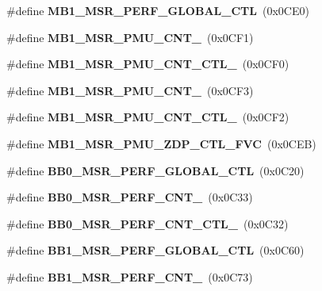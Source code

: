 \begin{DoxyCompactItemize}
\item 
\#define {\bfseries M\+B1\+\_\+\+M\+S\+R\+\_\+\+P\+E\+R\+F\+\_\+\+G\+L\+O\+B\+A\+L\+\_\+\+C\+T\+L}~(0x0\+C\+E0)\label{types_8h_a8aaf763a5f24ae67e344355e5e29b1d9}

\item 
\#define {\bfseries M\+B1\+\_\+\+M\+S\+R\+\_\+\+P\+M\+U\+\_\+\+C\+N\+T\+\_}~(0x0\+C\+F1)\label{types_8h_a81d488eaa84dfb353d4efcf2b1e20081}

\item 
\#define {\bfseries M\+B1\+\_\+\+M\+S\+R\+\_\+\+P\+M\+U\+\_\+\+C\+N\+T\+\_\+\+C\+T\+L\+\_}~(0x0\+C\+F0)\label{types_8h_a3b528747d7aa55a42ec7e67955157d44}

\item 
\#define {\bfseries M\+B1\+\_\+\+M\+S\+R\+\_\+\+P\+M\+U\+\_\+\+C\+N\+T\+\_}~(0x0\+C\+F3)\label{types_8h_add7e5a997296911b1eeef0d72990217e}

\item 
\#define {\bfseries M\+B1\+\_\+\+M\+S\+R\+\_\+\+P\+M\+U\+\_\+\+C\+N\+T\+\_\+\+C\+T\+L\+\_}~(0x0\+C\+F2)\label{types_8h_a5d10d73c3cadef48250f288b4deae7f4}

\item 
\#define {\bfseries M\+B1\+\_\+\+M\+S\+R\+\_\+\+P\+M\+U\+\_\+\+Z\+D\+P\+\_\+\+C\+T\+L\+\_\+\+F\+V\+C}~(0x0\+C\+E\+B)\label{types_8h_a3dc9c0af51020d80f04cd959628a6fe4}

\item 
\#define {\bfseries B\+B0\+\_\+\+M\+S\+R\+\_\+\+P\+E\+R\+F\+\_\+\+G\+L\+O\+B\+A\+L\+\_\+\+C\+T\+L}~(0x0\+C20)\label{types_8h_a96724c63333fd75d0b4f6df6f15c00cc}

\item 
\#define {\bfseries B\+B0\+\_\+\+M\+S\+R\+\_\+\+P\+E\+R\+F\+\_\+\+C\+N\+T\+\_}~(0x0\+C33)\label{types_8h_a4b97b6b3bcbaff8c0b586f39950c6843}

\item 
\#define {\bfseries B\+B0\+\_\+\+M\+S\+R\+\_\+\+P\+E\+R\+F\+\_\+\+C\+N\+T\+\_\+\+C\+T\+L\+\_}~(0x0\+C32)\label{types_8h_a25fee148c332891795513f9b1a05cffa}

\item 
\#define {\bfseries B\+B1\+\_\+\+M\+S\+R\+\_\+\+P\+E\+R\+F\+\_\+\+G\+L\+O\+B\+A\+L\+\_\+\+C\+T\+L}~(0x0\+C60)\label{types_8h_aabcec1d26741254e752a93e1804ff3b5}

\item 
\#define {\bfseries B\+B1\+\_\+\+M\+S\+R\+\_\+\+P\+E\+R\+F\+\_\+\+C\+N\+T\+\_}~(0x0\+C73)\label{types_8h_a33e4ec281632da2dc617bc5d5178acc4}


\end{DoxyCompactItemize}
